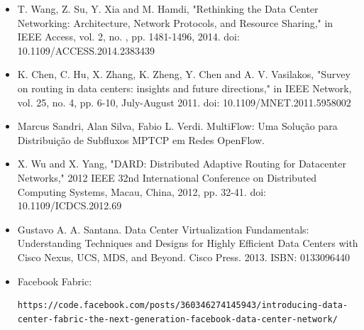 \documentclass[12pt,a4paper]{report}
\begin{document}
\begin{itemize}
\item T. Wang, Z. Su, Y. Xia and M. Hamdi, "Rethinking the Data Center Networking: Architecture, Network Protocols, and Resource Sharing," in IEEE Access, vol. 2, no. , pp. 1481-1496, 2014. doi: 10.1109/ACCESS.2014.2383439
\item K. Chen, C. Hu, X. Zhang, K. Zheng, Y. Chen and A. V. Vasilakos, "Survey on routing in data centers: insights and future directions," in IEEE Network, vol. 25, no. 4, pp. 6-10, July-August 2011.
doi: 10.1109/MNET.2011.5958002
\item Marcus Sandri, Alan Silva, Fabio L. Verdi. MultiFlow: Uma Solução para Distribuição de Subfluxos MPTCP em Redes OpenFlow.
\item X. Wu and X. Yang, "DARD: Distributed Adaptive Routing for Datacenter Networks," 2012 IEEE 32nd International Conference on Distributed Computing Systems, Macau, China, 2012, pp. 32-41.
doi: 10.1109/ICDCS.2012.69
\item Gustavo A. A. Santana. Data Center Virtualization Fundamentals: Understanding Techniques and Designs for Highly Efficient Data Centers with Cisco Nexus, UCS, MDS, and Beyond. Cisco Press. 2013. ISBN: 0133096440
\item Facebook Fabric: \begin{verbatim}https://code.facebook.com/posts/360346274145943/introducing-data-center-fabric-the-next-generation-facebook-data-center-network/\end{verbatim}
\end{itemize}
\end{document}
